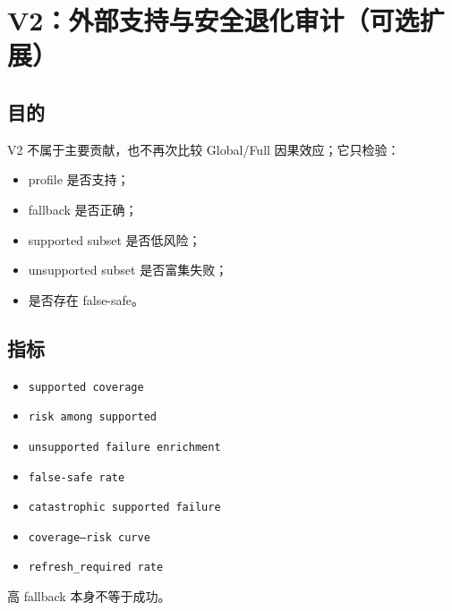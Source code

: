 \section{V2：外部支持与安全退化审计（可选扩展）}

\subsection{目的}

V2 不属于主要贡献，也不再次比较 Global/Full 因果效应；它只检验：
\begin{itemize}
  \item profile 是否支持；
  \item fallback 是否正确；
  \item supported subset 是否低风险；
  \item unsupported subset 是否富集失败；
  \item 是否存在 false-safe。
\end{itemize}

\subsection{指标}

\begin{itemize}
  \item \texttt{supported coverage}
  \item \texttt{risk among supported}
  \item \texttt{unsupported failure enrichment}
  \item \texttt{false-safe rate}
  \item \texttt{catastrophic supported failure}
  \item \texttt{coverage--risk curve}
  \item \texttt{refresh\_required rate}
\end{itemize}

高 fallback 本身不等于成功。
